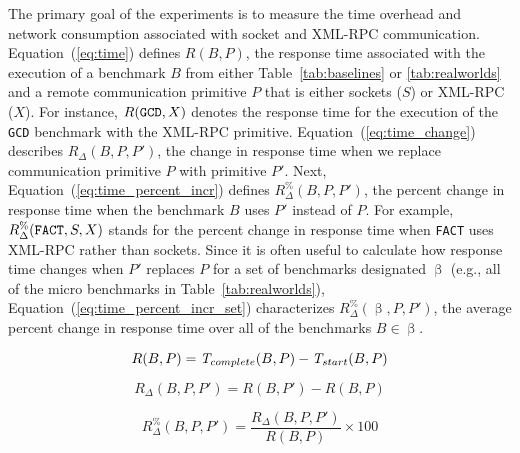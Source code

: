 \documentclass{sig-alternate}
\begin{document}



The primary goal of the experiments is to measure the time overhead
and network consumption associated with socket and XML-RPC
communication.  Equation~(\ref{eq:time}) defines $R(B,P)$, the
response time associated with the execution of a benchmark $B$ from
either Table~\ref{tab:baselines} or \ref{tab:realworlds} and a remote
communication primitive $P$ that is either sockets ($S$) or XML-RPC
($X$).  For instance, $R(\mbox{{\tt GCD}}, X)$ denotes the response
time for the execution of the {\tt GCD} benchmark with the XML-RPC
primitive.  Equation~(\ref{eq:time_change}) describes $R_\Delta
(B,P,P')$, the change in response time when we replace communication
primitive $P$ with primitive $P'$.  Next,
Equation~(\ref{eq:time_percent_incr}) defines {\small
  $R_\Delta^\%(B,P,P')$}, the percent change in response time when the
benchmark $B$ uses $P'$ instead of $P$.  For example, {\small
  $R_\Delta^\%(\mbox{{\tt FACT}},S,X)$} stands for the percent change
in response time when {\tt FACT} uses XML-RPC rather than sockets.
Since it is often useful to calculate how response time changes when
$P'$ replaces $P$ for a set of benchmarks designated $\upbeta$ (e.g.,
all of the micro benchmarks in Table~\ref{tab:realworlds}),
Equation~(\ref{eq:time_percent_incr_set}) characterizes {\small
  $R_\Delta^\%(\upbeta,P,P')$}, the average percent change in response
time over all of the benchmarks $B \in \upbeta$.

\vspace*{-.1in}

\begin{equation} \label{eq:time}
R(B,P) = \mbox{{\em T}}_{complete}(B,P) - \mbox{{\em T}}_{start}(B,P)
\end{equation}

\vspace*{-.1in}

\begin{equation} \label{eq:time_change}
R_\Delta (B,P,P') = R(B,P') - R(B,P)
\end{equation}

\vspace*{-.1in}

\begin{equation} \label{eq:time_percent_incr}
R_\Delta^\%(B,P,P')  = \frac{R_\Delta (B,P,P')}{R(B,P)} \times 100
\end{equation}
\end{document}
